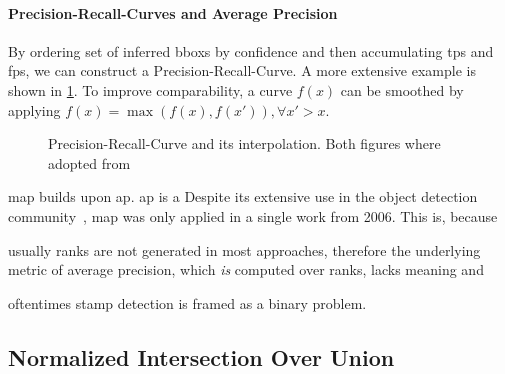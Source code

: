 \paragraph{Precision-Recall-Curves and Average Precision}\label{par:precision-recall-curves-ap}
By ordering set of inferred \glspl{bbox} by confidence and then accumulating
\glspl{tp} and \glspl{fp}, we can construct a Precision-Recall-Curve.
A more extensive example is shown in \cref{fig:precision-recall-curve}.
To improve comparability, a curve \(f(x)\) can be smoothed by applying
\(f(x) = \max (f(x), f(x')), \forall x' > x\). 

\begin{figure}[!tpb]
    \center
    \caption[short={Precision-Recall-Curve}]{Precision-Recall-Curve and its
    interpolation. Both figures where adopted from~\cite{Padilla.2019}}
    \label{fig:precision-recall-curve}
\end{figure}

\Gls{map} builds upon \gls{ap}. \Gls{ap} is a 
Despite its extensive use in the object detection community~\cite{Liu.2016,Ren.20150604}, 
\Gls{map} was only applied in a single work \cite{Zhu.2006} from 2006. This is,
because 
\begin{enumerate*}[i.)]
    \item usually ranks are not generated in most approaches, therefore the 
    underlying metric of average precision, which \textit{is} computed over ranks, 
    lacks meaning and
    \item oftentimes stamp detection is framed as a binary problem.
\end{enumerate*} 

\subsection{Normalized Intersection Over Union}\label{subsect:normalized-iou}
\blindtext[1]

